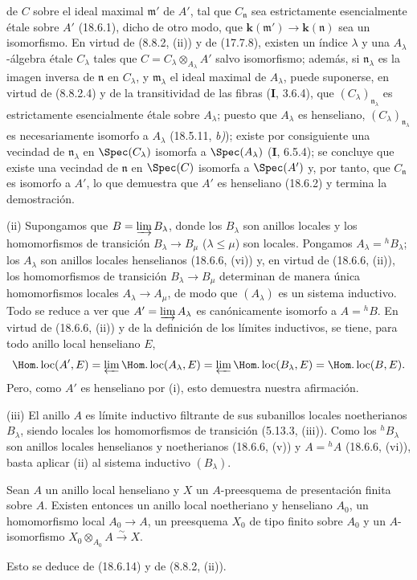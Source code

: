 de $C$ sobre el ideal maximal $\mathfrak m'$ de $A'$, tal que $C_{\mathfrak n}$ sea estrictamente esencialmente étale sobre $A'$ (18.6.1), dicho de otro modo, que $\boldsymbol k(\mathfrak m')\to \boldsymbol k(\mathfrak n)$ sea un isomorfismo. En virtud de (8.8.2, (ii)) y de (17.7.8), existen un índice $\lambda$ y una $A_\lambda$-álgebra étale $C_\lambda$ tales que $C=C_\lambda\otimes_{A_\lambda}A'$ salvo isomorfismo; además, si $\mathfrak n_\lambda$ es la imagen inversa de $\mathfrak n$ en $C_\lambda$, y $\mathfrak m_\lambda$ el ideal maximal de $A_\lambda$, puede suponerse, en virtud de (8.8.2.4) y de la transitividad de las fibras (\textbf I, 3.6.4), que $(C_\lambda)_{\mathfrak n_\lambda}$ es estrictamente esencialmente étale sobre $A_\lambda$; puesto que $A_\lambda$ es henseliano, $(C_\lambda)_{\mathfrak n_\lambda}$ es necesariamente isomorfo a $A_\lambda$ (18.5.11, \emph{b)}); existe por consiguiente una vecindad de $\mathfrak n_\lambda$ en $\Spec(C_\lambda)$ isomorfa a $\Spec(A_\lambda)$ (\textbf I, 6.5.4); se concluye que existe una vecindad de $\mathfrak n$ en $\Spec(C)$ isomorfa a $\Spec(A')$ y, por tanto, que $C_{\mathfrak n}$ es isomorfo a $A'$, lo que demuestra que $A'$ es henseliano (18.6.2) y termina la demostración.

(ii) Supongamos que $B=\varinjlim B_\lambda$, donde los $B_\lambda$ son anillos locales y los homomorfismos de transición $B_\lambda\to B_\mu$ ($\lambda\leq\mu$) son locales. Pongamos $A_\lambda={}^h\!B_\lambda$; los $A_\lambda$ son anillos locales henselianos (18.6.6, (vi)) y, en virtud de (18.6.6, (ii)), los homomorfismos de transición $B_\lambda\to B_\mu$ determinan de manera única homomorfismos locales $A_\lambda\to A_\mu$, de modo que $(A_\lambda)$ es un sistema inductivo. Todo se reduce a ver que $A'=\varinjlim A_\lambda$ es canónicamente isomorfo a $A={}^h\!B$. En virtud de (18.6.6, (ii)) y de la definición de los límites inductivos, se tiene, para todo anillo local henseliano $E$,
\[
  \Hom.\operatorname{loc}(A',E)
  =\varprojlim\Hom.\operatorname{loc}(A_\lambda,E)
  =\varprojlim\Hom.\operatorname{loc}(B_\lambda,E)
  =\Hom.\operatorname{loc}(B,E).
\]
Pero, como $A'$ es henseliano por (i), esto demuestra nuestra afirmación.

(iii) El anillo $A$ es límite inductivo filtrante de sus subanillos locales noetherianos $B_\lambda$, siendo locales los homomorfismos de transición (5.13.3, (iii)). Como los ${}^h\!B_\lambda$ son anillos locales henselianos y noetherianos (18.6.6, (v)) y $A={}^h\!A$ (18.6.6, (vi)), basta aplicar (ii) al sistema inductivo $(B_\lambda)$.

\begin{corollary}[18.6.15]
\label{IV.18.6.15}
Sean $A$ un anillo local henseliano y $X$ un $A$-preesquema de presentación finita sobre $A$. Existen entonces un anillo local noetheriano y henseliano $A_0$, un homomorfismo local $A_0\to A$, un preesquema $X_0$ de tipo finito sobre $A_0$ y un $A$-isomorfismo $X_0\otimes_{A_0}A\xrightarrow{\sim}X$.
\end{corollary}

Esto se deduce de (18.6.14) y de (8.8.2, (ii)).

